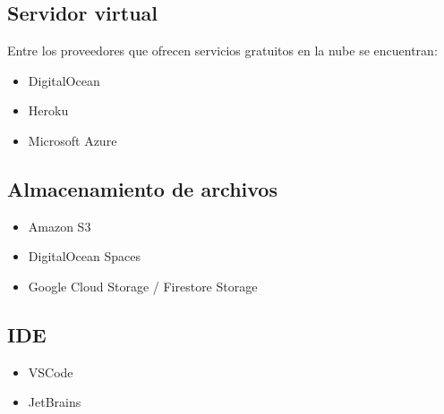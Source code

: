 

\subsection{Servidor virtual}\label{subsection:elegirCloud}
Entre los proveedores que ofrecen servicios gratuitos en la nube se encuentran:

\begin{itemize}
    \item DigitalOcean
    \item Heroku
    \item Microsoft Azure
\end{itemize}




\subsection{Almacenamiento de archivos}
\begin{itemize}
    \item Amazon S3
    \item DigitalOcean Spaces
    \item Google Cloud Storage / Firestore Storage
\end{itemize}

\subsection{IDE}
\begin{itemize}
    \item VSCode
    \item JetBrains
\end{itemize}


